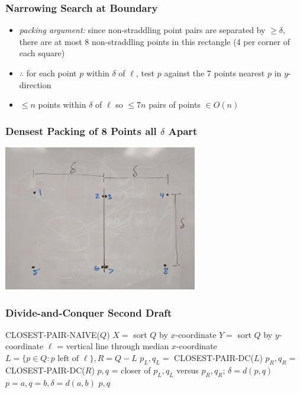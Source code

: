 \documentclass{beamer}
\begin{document}
\begin{frame} \frametitle{Narrowing Search at Boundary}
\begin{itemize}
  \item \emph{packing argument:} since non-straddling point pairs are separated by $\geq \delta,$
    there are at most 8 non-straddling points in this rectangle (4 per corner of each square)
  \item $\therefore$ for each point $p$ within $\delta$ of $\ell$, test $p$ against
    the 7 points nearest $p$ in $y$-direction
  \item $\leq n$ points within $\delta$ of $\ell$ so $\leq 7n$ pairs of points $\in O(n)$
\end{itemize}
\end{frame}

\begin{frame} \frametitle{Densest Packing of 8 Points all $\delta$ Apart}
  \begin{center}
    \includegraphics[height=2.5in]{closest-pair-packing.jpg}
  \end{center}
\end{frame}

\begin{frame} \frametitle{Divide-and-Conquer Second Draft}
  {\footnotesize
\begin{algorithmic}[1]
      \State \Return CLOSEST-PAIR-NAIVE($Q$)
    \Else
      \State $X = $ sort $Q$ by $x$-coordinate
      \State $Y = $ sort $Q$ by $y$-coordinate
      \State $\ell$ = vertical line through median $x$-coordinate
      \State $L = \{p \in Q : p \text{ left of } \ell\}, R = Q-L$
      \State $p_L, q_L = $ CLOSEST-PAIR-DC($L$)
      \State $p_R, q_R = $ CLOSEST-PAIR-DC($R$)
      \State $p, q$ = closer of $p_L, q_L$ versus $p_R, q_R$; $\delta=d(p,q)$
            \State $p=a, q=b, \delta=d(a,b)$
          \EndIf
        \EndFor
      \EndFor
      \State \Return $p, q$
    \EndIf
  \EndFunction
\end{algorithmic}
}
\end{frame}
\end{document}
